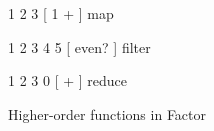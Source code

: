 \centering

\begin{minipage}{0.65\linewidth}
  \begin{factorcode}
    { 1 2 3 } [ 1 + ] map

    { 1 2 3 4 5 } [ even? ] filter

    { 1 2 3 } 0 [ + ] reduce
  \end{factorcode}
\end{minipage}

\caption{Higher-order functions in Factor}
